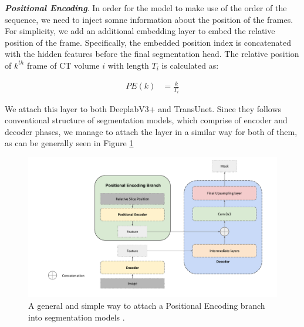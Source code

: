 
\textbf{\textit{Positional Encoding}}. In order for the model to make use of the order of the sequence, we need to inject somne information about the position of the frames. For simplicity, we add an additional embedding layer to embed the relative position of the frame. Specifically, the embedded position index is concatenated with the hidden features before the final segmentation head. The relative position of $k^{th}$ frame of CT volume $i$ with length $T_i$ is calculated as:

\begin{align}
        PE(k) &= \frac{k}{T_i}
\end{align}

We attach this layer to both DeeplabV3+ and TransUnet. Since they follows conventional structure of segmentation models, which comprise of encoder and decoder phases, we manage to attach the layer in a similar way for both of them, as can be generally seen in Figure \ref{fig:pe_arch}

\begin{figure}[!h]
    \centering
    \includegraphics[width=\textwidth]{resources/new_images/pe.pdf}
    \caption{A general and simple way to attach a Positional Encoding branch into segmentation models . }
    \label{fig:pe_arch}
\end{figure}